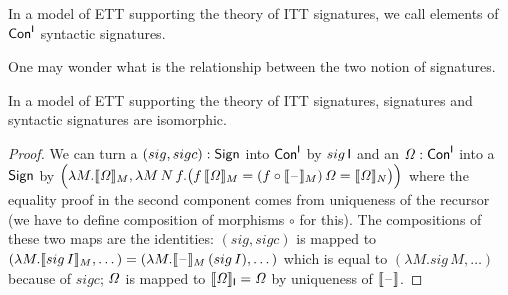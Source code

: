 \documentclass[a4paper,UKenglish,cleveref, autoref]{lipics-v2019}
\begin{document}
\begin{definition}\label{def:syntacticsignature}
  In a model of ETT supporting the theory of ITT signatures, we call
  elements of $\mathsf{Con}^{\mathsf{I}}$ syntactic signatures.
\end{definition}

One may wonder what is the relationship between the two notion of
signatures.
\begin{lemma}
  In a model of ETT supporting the theory of ITT signatures,
  signatures and syntactic signatures are isomorphic.
\end{lemma}
\begin{proof}
  We can turn a $({sig},{sigc}) : \mathsf{Sign}$ into $\mathsf{Con}^{\mathsf{I}}$ by ${sig}\,\mathsf{I}$
  and an $\mathit{\Omega}:\mathsf{Con}^{\mathsf{I}}$ into a $\mathsf{Sign}$ by
  $\Big(\lambda M.\llbracket\mathit{\Omega}\rrbracket_M, \lambda M\,N\,f.\big(f\,\llbracket\mathit{\Omega}\rrbracket_M =
  (f\circ\llbracket\mathord{\hspace{1pt}\text{--}\hspace{1pt}}\rrbracket_M)\,\mathit{\Omega} = \llbracket\mathit{\Omega}\rrbracket_N\big)\Big)$ where the equality
  proof in the second component comes from uniqueness of the recursor
  (we have to define composition of morphisms $\circ$ for this). The
  compositions of these two maps are the identities: $({sig},{sigc})$
  is mapped to
  $(\lambda M.\llbracket{sig}\,I\rrbracket_M,\dots) = (\lambda
  M.\llbracket\mathord{\hspace{1pt}\text{--}\hspace{1pt}}\rrbracket_M\,({sig}\,I),\dots)$ which is equal to
  $(\lambda M.{sig}\,M,\dots)$ because of ${sigc}$; $\mathit{\Omega}$ is mapped
  to $\llbracket\mathit{\Omega}\rrbracket_{\mathsf{I}} = \mathit{\Omega}$ by uniqueness of $\llbracket\mathord{\hspace{1pt}\text{--}\hspace{1pt}}\rrbracket$.
\end{proof}
\end{document}
